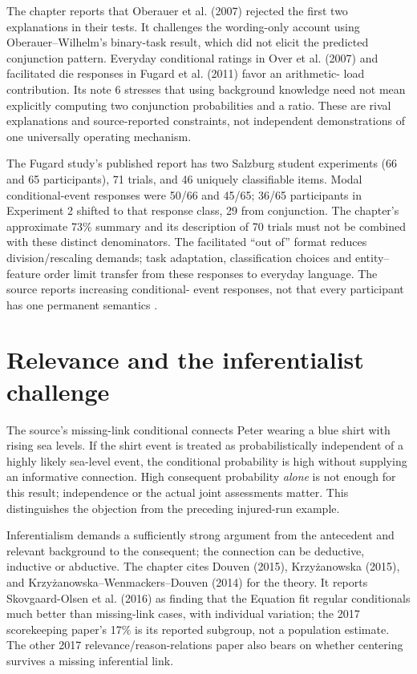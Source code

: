 The chapter reports that Oberauer et al. (2007) rejected the first two
explanations in their tests. It challenges the wording-only account using
Oberauer--Wilhelm's binary-task result, which did not elicit the predicted
conjunction pattern. Everyday conditional ratings in Over et al. (2007)
and facilitated die responses in Fugard et al. (2011) favor an arithmetic-
load contribution. Its note 6 stresses that using background knowledge
need not mean explicitly computing two conjunction probabilities and a
ratio. These are rival explanations and source-reported constraints, not
independent demonstrations of one universally operating mechanism.

The Fugard study's published report has two Salzburg student experiments
(66 and 65 participants), 71 trials, and 46 uniquely classifiable items.
Modal conditional-event responses were 50/66 and 45/65; 36/65 participants
in Experiment 2 shifted to that response class, 29 from conjunction.
The chapter's approximate 73\% summary and its description of 70 trials
must not be combined with these distinct denominators. The facilitated
``out of'' format reduces division/rescaling demands; task adaptation,
classification choices and entity--feature order limit transfer from these
responses to everyday language. The source reports increasing conditional-
event responses, not that every participant has one permanent semantics
\cite[pp.~637--642,647]{FugardEtAl2011ConditionalEvent}.

\section{Relevance and the inferentialist challenge}
\label{sec:p19-rat46-relevance}

The source's missing-link conditional connects Peter wearing a blue shirt
with rising sea levels. If the shirt event is treated as probabilistically
independent of a highly likely sea-level event, the conditional probability
is high without supplying an informative connection. High consequent
probability \emph{alone} is not enough for this result; independence or
the actual joint assessments matter. This distinguishes the objection
from the preceding injured-run example.

Inferentialism demands a sufficiently strong argument from the antecedent
and relevant background to the consequent; the connection can be deductive,
inductive or abductive. The chapter cites Douven (2015), Krzy\.{z}anowska
(2015), and Krzy\.{z}anowska--Wenmackers--Douven (2014) for the theory.
It reports Skovgaard-Olsen et al. (2016) as finding that the Equation fit
regular conditionals much better than missing-link cases, with individual
variation; the 2017 scorekeeping paper's 17\% is its reported subgroup,
not a population estimate. The other 2017 relevance/reason-relations paper
also bears on whether centering survives a missing inferential link.


